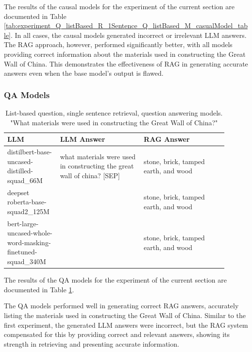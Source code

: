 \documentclass{wseas}
\begin{document}
The results of the causal models for the experiment of the current section 
are documented in Table \ref{tab:experiment_Q_listBased_R_1Sentence_Q_listBased_M_casualModel_table}.
In all cases, the causal models generated incorrect or irrelevant LLM
answers. The RAG approach, however, performed significantly better, with
all models providing correct information about the materials used in
constructing the Great Wall of China. This demonstrates the
effectiveness of RAG in generating accurate answers even when the base
model's output is flawed.

\subsubsection{QA Models}


\begin{table}[htbp]
  \centering
  \caption{List-based question, single sentence retrieval, question answering models. "What materials were used in constructing the Great Wall of China?"} %
  \label{tab:experiment_Q_listBased_R_1Sentence_Q_listBased_M_QaModels_table} 
  \begin{tabular}{|p{0.20\linewidth}|p{0.35\linewidth}|p{0.35\linewidth}|}
    \hline
    \textbf{LLM} & \textbf{LLM Answer} & \textbf{RAG Answer} \\ \hline
    distilbert-base-uncased-distilled-squad\_66M & what materials were used in constructing the great wall of china? {[}SEP{]} & stone, brick, tamped earth, and wood \\ \hline
    deepset roberta-base-squad2\_125M & & stone, brick, tamped earth, and wood \\ \hline
    bert-large-uncased-whole-word-masking-finetuned-squad\_340M & & stone, brick, tamped earth, and wood \\ \hline
  \end{tabular}
\end{table}


The results of the QA models for the experiment of the current section 
are documented in Table \ref{tab:experiment_Q_listBased_R_1Sentence_Q_listBased_M_QaModels_table}.

The QA models performed well in generating correct RAG answers,
accurately listing the materials used in constructing the Great Wall of
China. Similar to the first experiment, the generated LLM answers were
incorrect, but the RAG system compensated for this by providing correct
and relevant answers, showing its strength in retrieving and presenting
accurate information.
\end{document}
